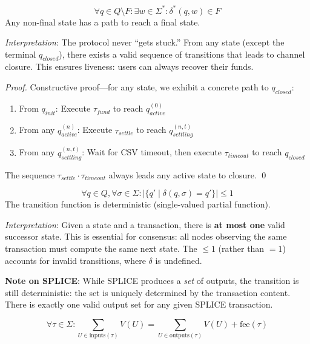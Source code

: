 \begin{theorem}[Termination]
$$\forall q \in Q \setminus F: \exists w \in \Sigma^*: \delta^*(q, w) \in F$$
Any non-final state has a path to reach a final state.
\end{theorem}

\textit{Interpretation}: The protocol never ``gets stuck.'' From any state (except the terminal $q_{closed}$), there exists a valid sequence of transitions that leads to channel closure. This ensures liveness: users can always recover their funds.

\begin{proof}
Constructive proof---for any state, we exhibit a concrete path to $q_{closed}$:
\begin{enumerate}
    \item From $q_{init}$: Execute $\tau_{fund}$ to reach $q_{active}^{(0)}$
    \item From any $q_{active}^{(n)}$: Execute $\tau_{settle}$ to reach $q_{settling}^{(n,t)}$
    \item From any $q_{settling}^{(n,t)}$: Wait for CSV timeout, then execute $\tau_{timeout}$ to reach $q_{closed}$
\end{enumerate}
The sequence $\tau_{settle} \cdot \tau_{timeout}$ always leads any active state to closure. \qed
\end{proof}

\begin{theorem}[Unambiguity]
$$\forall q \in Q, \forall \sigma \in \Sigma: |\{q' \mid \delta(q, \sigma) = q'\}| \leq 1$$
The transition function is deterministic (single-valued partial function).
\end{theorem}

\textit{Interpretation}: Given a state and a transaction, there is \textbf{at most one} valid successor state. This is essential for consensus: all nodes observing the same transaction must compute the same next state. The $\leq 1$ (rather than $= 1$) accounts for invalid transitions, where $\delta$ is undefined.

\textbf{Note on SPLICE}: While SPLICE produces a \textit{set} of outputs, the transition is still deterministic: the set is uniquely determined by the transaction content. There is exactly one valid output set for any given SPLICE transaction.

\begin{theorem}
$$\forall \tau \in \Sigma: \sum_{U \in \text{inputs}(\tau)} V(U) = \sum_{U \in \text{outputs}(\tau)} V(U) + \text{fee}(\tau)$$
\end{theorem}

